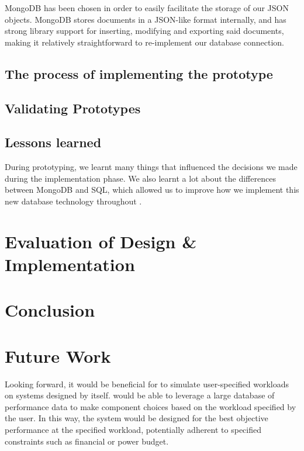\documentclass[11pt]{article}
\begin{document}
		MongoDB has been chosen in order to easily facilitate the storage of our JSON objects.
		MongoDB stores documents in a JSON-like format internally, and has strong library support for inserting, modifying and exporting said documents, making it relatively straightforward to re-implement our database connection.
	
	\subsection{The process of implementing the prototype}

	\subsection{Validating Prototypes}

	\subsection{Lessons learned}
		During prototyping, we learnt many things that influenced the decisions we made during the implementation phase.
		We also learnt a lot about the differences between MongoDB and SQL, which allowed us to improve how we implement this new database technology throughout \opendc{}.

\section{Evaluation of Design \& Implementation}


\section{Conclusion} \label{sec:conclusion}

\section{Future Work}
	Looking forward, it would be beneficial for \opendc{} to simulate user-specified workloads on systems designed by \opendc{} itself. 
	\opendc{} would be able to leverage a large database of performance data to make component choices based on the workload specified by the user. 
	In this way, the system would be designed for the best objective performance at the specified workload, potentially adherent to specified constraints such as financial or power budget.


\newpage


\end{document}
